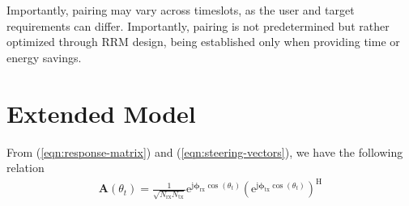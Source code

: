 \documentclass[10pt,journal,compsoc]{IEEEtran}
\theoremstyle{myremark}
\theoremstyle{myexample}
\begin{document}
\begin{appendices}
Importantly, pairing may vary across timeslots, as the user and target requirements can differ. Importantly, pairing is not predetermined but rather optimized through \gls{RRM} design, being established only when providing time or energy savings.




\setcounter{equation}{0}
\setcounter{table}{0}
\renewcommand{\theequation}{E.\arabic{equation}}
\section{Extended Model} \label{app:linearized-model}

From (\ref{eqn:response-matrix}) and (\ref{eqn:steering-vectors}), we have the following relation
\begin{align}
	\mathbf{A} \left( \theta_t \right) = \tfrac{1}{\sqrt{N_\mathrm{rx} N_\mathrm{tx}}}  \mathrm{e}^{\mathrm{j} \boldsymbol{\phi}_\mathrm{rx} \cos \left( \theta_t \right)} \left( \mathrm{e}^{\mathrm{j} \boldsymbol{\phi}_\mathrm{tx} \cos \left( \theta_t \right)} \right)^\mathrm{H}
\end{align}


\end{appendices}
\end{document}
